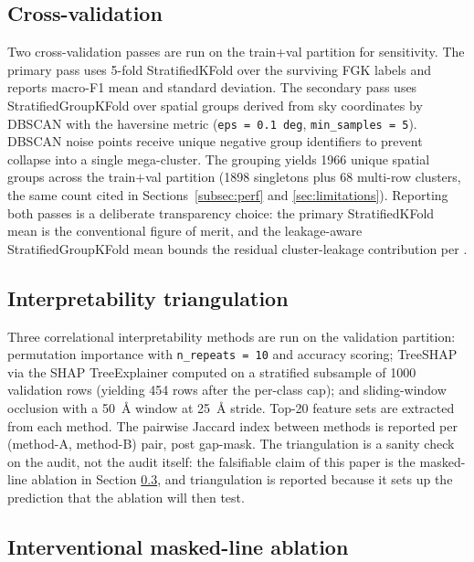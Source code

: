\documentclass[11pt,a4paper]{article}
\begin{document}
\subsection{Cross-validation}
\label{subsec:cv}

Two cross-validation passes are run on the train+val partition for sensitivity. The primary pass uses 5-fold StratifiedKFold over the surviving FGK labels and reports macro-F1 mean and standard deviation. The secondary pass uses StratifiedGroupKFold over spatial groups derived from sky coordinates by DBSCAN with the haversine metric (\texttt{eps = 0.1 deg}, \texttt{min\_samples = 5}). DBSCAN noise points receive unique negative group identifiers to prevent collapse into a single mega-cluster. The grouping yields 1966 unique spatial groups across the train$+$val partition (1898 singletons plus 68 multi-row clusters, the same count cited in Sections~\ref{subsec:perf} and \ref{sec:limitations}). Reporting both passes is a deliberate transparency choice: the primary StratifiedKFold mean is the conventional figure of merit, and the leakage-aware StratifiedGroupKFold mean bounds the residual cluster-leakage contribution per \citet{2019MNRAS.486.2075B}.

\subsection{Interpretability triangulation}
\label{subsec:triangulation}

Three correlational interpretability methods are run on the validation partition: permutation importance with \texttt{n\_repeats = 10} and accuracy scoring; TreeSHAP via the SHAP TreeExplainer \citep{LundbergLee2017SHAP} computed on a stratified subsample of 1000 validation rows (yielding 454 rows after the per-class cap); and sliding-window occlusion with a 50~\AA{} window at 25~\AA{} stride. Top-20 feature sets are extracted from each method. The pairwise Jaccard index between methods is reported per (method-A, method-B) pair, post gap-mask. The triangulation is a sanity check on the audit, not the audit itself: the falsifiable claim of this paper is the masked-line ablation in Section \ref{subsec:ablation}, and triangulation is reported because it sets up the prediction that the ablation will then test.

\subsection{Interventional masked-line ablation}
\label{subsec:ablation}
\end{document}
